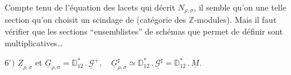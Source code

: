 Compte tenu de l'équation des lacets qui décrit $N_{\rho,\sigma}$, il semble qu'on  une telle section  qu'on choisit un scindage de
(catégorie des $\mathbb Z$-modules). Mais il faut vérifier que les sections \textquotedblleft ensemblistes\textquotedblright{} de schémas que  permet de définir sont multiplicatives\dots


\(6^\circ)\) \(\underline Z_{\rho,\sigma}\) et
\(\underline G_{\rho,\sigma}=\mathbb D_{12}^{*}\mathbin{.}\underline{\mathcal G}^{+},\quad
\underline G_{\rho,\sigma}^{\sharp}\simeq\mathbb D_{12}^{*}\mathbin{.}\underline{\mathcal G}^{\sharp}
=\mathbb D_{12}^{*}\mathbin{.}\underline M\).

